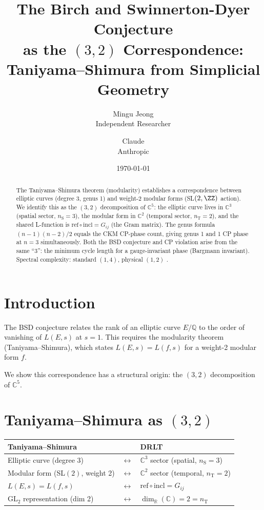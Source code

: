 \documentclass[12pt]{article}
\title{The Birch and Swinnerton-Dyer Conjecture\\
  as the $(3,2)$ Correspondence:\\
  Taniyama--Shimura from Simplicial Geometry}
\author{Mingu Jeong\\Independent Researcher
\and Claude\\Anthropic}
\date{\today}
\theoremstyle{remark}
\newcommand{\CC}{\mathbb{C}}
\newcommand{\RR}{\mathbb{R}}
\newcommand{\QQ}{\mathbb{Q}}
\newcommand{\nS}{n_{\mathrm{S}}}
\newcommand{\nT}{n_{\mathrm{T}}}
\begin{document}
\maketitle

\begin{abstract}
The Taniyama--Shimura theorem (modularity) establishes a
correspondence between elliptic curves (degree 3, genus 1)
and weight-2 modular forms (SL$(2, \ZZ)$ action). We identify
this as the $(3,2)$ decomposition of $\CC^5$: the elliptic
curve lives in $\CC^3$ (spatial sector, $\nS = 3$), the
modular form in $\CC^2$ (temporal sector, $\nT = 2$), and
the shared L-function is $\mathrm{ref} \circ \mathrm{incl}
= G_{ij}$ (the Gram matrix). The genus formula
$(n{-}1)(n{-}2)/2$ equals the CKM CP-phase count,
giving genus 1 and 1 CP phase at $n = 3$ simultaneously.
Both the BSD conjecture and CP violation arise from the
same ``3'': the minimum cycle length for a gauge-invariant
phase (Bargmann invariant). Spectral complexity:
standard $(1,4)$, physical $(1,2)$ \cite{Paper9}.
\end{abstract}

\section{Introduction}

The BSD conjecture relates the rank of an elliptic curve
$E/\QQ$ to the order of vanishing of $L(E, s)$ at $s = 1$.
This requires the modularity theorem (Taniyama--Shimura),
which states $L(E, s) = L(f, s)$ for a weight-2 modular form $f$.

We show this correspondence has a structural origin:
the $(3,2)$ decomposition of $\CC^5$.

\section{Taniyama--Shimura as $(3,2)$}

\begin{center}
\begin{tabular}{lll}
\toprule
Taniyama--Shimura & & DRLT \\
\midrule
Elliptic curve (degree 3) & $\leftrightarrow$
  & $\CC^3$ sector (spatial, $\nS = 3$) \\
Modular form (SL$(2)$, weight 2) & $\leftrightarrow$
  & $\CC^2$ sector (temporal, $\nT = 2$) \\
$L(E,s) = L(f,s)$ & $\leftrightarrow$
  & $\mathrm{ref} \circ \mathrm{incl} = G_{ij}$ \\
GL$_2$ representation (dim 2) & $\leftrightarrow$
  & $\dim_\RR(\CC) = 2 = \nT$ \\
\bottomrule
\end{tabular}
\end{center}
\end{document}
